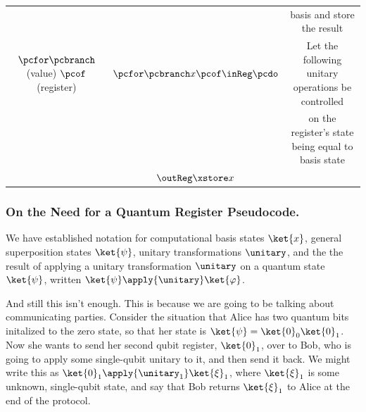 \begin{table}[h]
{\begin{tabular}{ccc}
        && basis and store the result \\
        $\pcfor \pcbranch$ (value) $\pcof$ (register) & $\pcfor \pcbranch x \pcof \inReg \pcdo$ & Let the following unitary operations be controlled \\
        && on the register's state being equal to basis state \\
        & \quad $\outReg \xstore x$ & \\ %
        \bottomrule
      \end{tabular}}
    \end{table}

  \subsubsection{On the Need for a Quantum Register Pseudocode.}
    We have established notation for computational basis states
      $\ket{x}$, general superposition states $\ket{\psi}$,
      unitary transformations $\unitary$, and the
      the result of applying a unitary transformation $\unitary$ on a
      quantum state $\ket{\psi}$, written 
      $\ket{\psi} \apply{\unitary} \ket{\varphi}$.

    And still this isn't enough. This is because we are going to be talking
      about communicating parties. Consider the situation that Alice has two
      quantum bits initalized to the zero state, so that her state is
      $\ket{\psi} = \ket{0}_0 \ket{0}_1$. Now she wants to send her second
      qubit register, $\ket{0}_1$, over to Bob, who is going to apply some
      single-qubit unitary to it, and then send it back. We might write this as
      $\ket{0}_1 \apply{\unitary_1} \ket{\xi}_1$, where $\ket{\xi}_1$ is some
      unknown, single-qubit state, and say that Bob returns $\ket{\xi}_1$ to
      Alice at the end of the protocol.

